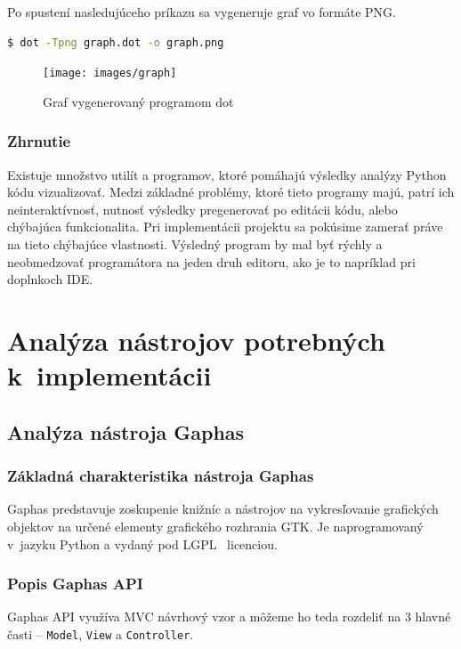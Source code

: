 \documentclass[11pt,oneside,final]{fithesis2}
\begin{document}
Po spustení nasledujúceho príkazu sa vygeneruje graf vo formáte PNG.

\begin{lstlisting}[language=bash]
$ dot -Tpng graph.dot -o graph.png
\end{lstlisting}
	

	\begin{figure}[htb]
	 \centering
	 \texttt{[image: images/graph]}
	 \caption{Graf vygenerovaný programom dot}
	\end{figure}
	
	
	\subsection{Zhrnutie}
	
	Existuje množstvo utilít a programov, ktoré pomáhajú výsledky analýzy Python kódu vizualizovať. Medzi základné problémy, ktoré tieto programy majú, patrí ich neinteraktívnosť, nutnosť výsledky pregenerovať po editácii kódu, alebo chýbajúca funkcionalita. Pri implementácii projektu sa pokúsime zamerať práve na tieto chýbajúce vlastnosti. Výsledný program by mal byť rýchly a neobmedzovať programátora na jeden druh editoru, ako je to napríklad pri doplnkoch IDE.
	
    
\chapter{Analýza nástrojov potrebných k~implementácii}

	\section{Analýza nástroja Gaphas}

	\subsection{Základná charakteristika nástroja Gaphas}

		Gaphas predstavuje zoskupenie knižníc a nástrojov na vykresľovanie grafických objektov na určené elementy grafického rozhrania GTK. Je naprogramovaný v~jazyku Python a vydaný pod LGPL~\cite{lgpl} licenciou.

	\subsection{Popis Gaphas API}

Gaphas API využíva MVC návrhový vzor a môžeme ho teda rozdeliť na 3 hlavné časti -- \texttt{Model}, \texttt{View} a \texttt{Controller}. 
\end{document}
